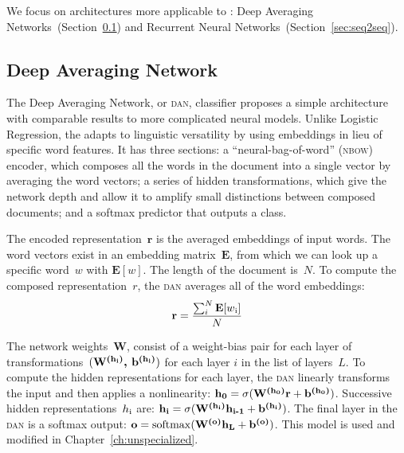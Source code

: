 We focus on architectures more applicable to \nlp{}: Deep Averaging Networks~(Section~\ref{sec:dan}) and Recurrent Neural Networks~(Section~\ref{sec:seq2seq}).


\subsection{Deep Averaging Network}
\label{sec:dan}
The Deep Averaging Network, or \textsc{dan}, classifier proposes a simple architecture with comparable results to more complicated neural models. 
%
Unlike Logistic Regression, the \dan{} adapts to linguistic versatility by using embeddings in lieu of specific word features.
%
It has three sections: a ``neural-bag-of-word'' (\textsc{nbow}) encoder, which
composes all the words in the document into a single vector by
averaging the word vectors; a series of hidden transformations, which
give the network depth and allow it to amplify small distinctions
between composed documents; and a softmax predictor that outputs a class.

The encoded representation~$\textbf{r}$ is the averaged embeddings of
input words.
%
 The word vectors exist in an embedding matrix~$\textbf{E}$, from which we can look up a specific word~$w$ with $\textbf{E}[w]$. The length of the document is~$N$. To compute
the composed representation~$r$, the \textsc{dan} averages all of the
word embeddings:
\begin{equation}
\textbf{r} = \frac{\sum_{i}^{N}\textbf{E}[w\textsubscript{i}]}{N}
\end{equation}

The network weights~$\textbf{W}$, consist of a weight-bias pair for each layer of
transformations~$(\textbf{W\textsuperscript{(h\textsubscript{i})}, b\textsuperscript{(h\textsubscript{i})}})$ for each layer $i$ in the list of
layers~$L$. To compute the hidden representations for each layer, the
\textsc{dan}  linearly transforms the input and then applies a nonlinearity:
$
\textbf{h\textsubscript{0}} = \sigma (\textbf{W\textsuperscript{(h\textsubscript{0})}}\textbf{r}+\textbf{b\textsuperscript{(h\textsubscript{0})}})
$.
Successive hidden representations~$h\textsubscript{i}$ are:
$
\textbf{h\textsubscript{i}} = \sigma (\textbf{W\textsuperscript{(h\textsubscript{i})}}\textbf{h\textsubscript{i-1}}+\textbf{b\textsuperscript{(h\textsubscript{i})}})
$.
The final layer in the \textsc{dan} is a softmax output:
$
\textbf{o} = \mathrm{softmax}(\textbf{W\textsuperscript{(o)}}\textbf{h\textsubscript{L}} + \textbf{b\textsuperscript{(o)}})
$.
%
This model is used and modified in Chapter~\ref{ch:unspecialized}.


